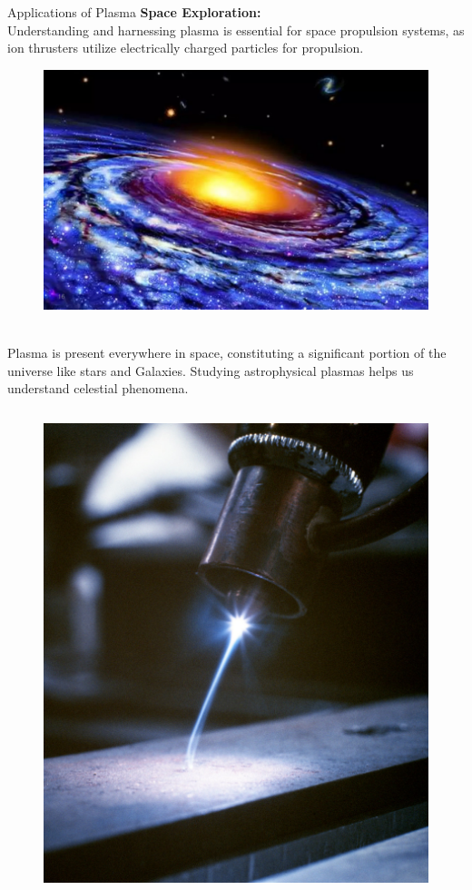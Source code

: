 \documentclass[13pt]{beamer}
\begin{document}
\begin{frame}[t,allowframebreaks]{Applications of Plasma}
	 \textbf{Space Exploration:} \\
		Understanding and harnessing plasma is essential for space propulsion systems, as ion thrusters utilize electrically charged particles for propulsion.
		\begin{figure}
			\centering
			\includegraphics[height=0.3 \textwidth]{Images/apps (2).jpg}
		\end{figure}
		\\
		  Plasma is present everywhere in space, constituting a significant portion of the universe like stars and Galaxies.
		Studying astrophysical plasmas helps us understand celestial phenomena.








		 \begin{columns}


\begin{figure}
	\centering
	\includegraphics[width = \textwidth]{Images/application.jpg}
\end{figure}


\end{columns}
\end{frame}
\end{document}
